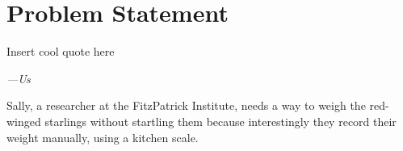 \documentclass[class=report,11pt,crop=false]{standalone}
\begin{document}
	\chapter{Problem Statement \label{ch:problem}}
	\epigraph{Insert cool quote here}%
	{\emph{---Us}}
	\vspace{0.5cm}
	Sally, a researcher at the FitzPatrick Institute, needs a way to weigh the red-winged starlings without startling them because interestingly they record their weight manually, using a kitchen scale.
	
	\ifstandalone
	
	\printnoidxglossary[type=\acronymtype,nonumberlist]
	\fi
\end{document}
